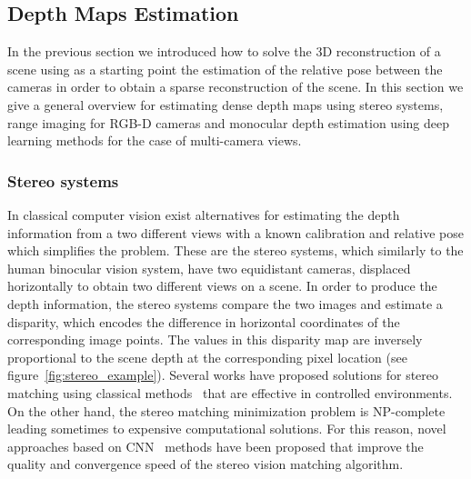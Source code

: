 \subsection{Depth Maps Estimation}

In the previous section we introduced how to solve the 3D reconstruction of a scene using as a starting point the estimation of the relative pose between the cameras in order to obtain a sparse reconstruction of the scene. In this section we give a general overview for estimating dense depth maps using stereo systems, range imaging for RGB-D cameras and monocular depth estimation using deep learning methods for the case of multi-camera views.

\subsubsection{Stereo systems}

In classical computer vision exist alternatives for estimating the depth information from a two different views with a known calibration and relative pose which simplifies the problem. These are the stereo systems, which similarly to the human binocular vision system, have two equidistant cameras, displaced horizontally to obtain two different views on a scene. In order to produce the depth information, the stereo systems compare the two images and estimate a disparity, which encodes the difference in horizontal coordinates of the corresponding image points. The values in this disparity map are inversely proportional to the scene depth at the corresponding pixel location (see figure~\ref{fig:stereo_example}). Several works have proposed solutions for stereo matching using classical methods~\cite{boykov2001} that are effective in controlled environments. On the other hand, the stereo matching minimization problem is NP-complete leading sometimes to expensive computational solutions. For this reason, novel approaches based on CNN~\cite{fischer2015flownet, ahmadi2016} methods have been proposed that improve the quality and convergence speed of the stereo vision matching algorithm.


